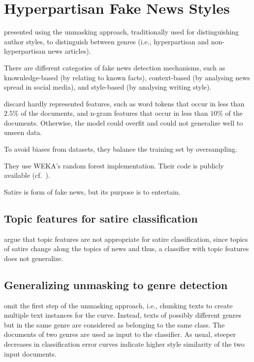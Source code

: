 \section{Hyperpartisan Fake News Styles}
\label{sec:hyperpartisan_fake_news_styles}

\citet{potthast_stylometric_2018} presented using the unmasking approach, traditionally used for distinguishing author styles, 
to distinguish between genres (i.e., hyperpartisan and non-hyperpartisan news articles). 

There are different categories of fake news detection mechanisms, such as knownledge-based (by relating to known facts), 
context-based (by analysing news spread in social media), and style-based (by analysing writing style).

\citet{potthast_stylometric_2018} discard hardly represented features, such as word tokens that occur in less than $2.5 \%$ of the documents, 
and n-gram features that occur in less than $10 \%$ of the documents.
Otherwise, the model could overfit and could not generalize well to unseen data.

To avoid biases from datasets, they balance the training set by oversampling.

They use WEKA's random forest implementation.
Their code is publicly available (cf.~\citep{potthast_stylometric_2018}). 

Satire is form of fake news, but its purpose is to entertain.

\subsection{Topic features for satire classification}
\label{sec:topic_features_for_sarcasm_classification}

\citet{potthast_stylometric_2018} argue that topic features are not appropriate for satire classification, 
since topics of satire change along the topics of news and thus, a classifier with topic features does not generalize.

\subsection{Generalizing unmasking to genre detection}
\label{sec:generalizing_unmasking_to_genre_detection}

\citet{potthast_stylometric_2018} omit the first step of the unmasking approach, i.e., chunking texts to create multiple text instances for the curve.
Instead, texts of possibly different genres but in the same genre are considered as belonging to the same class.
The documents of two genres are used as input to the classifier.
As usual, steeper decreases in classification error curves indicate higher style similarity of the two input documents.